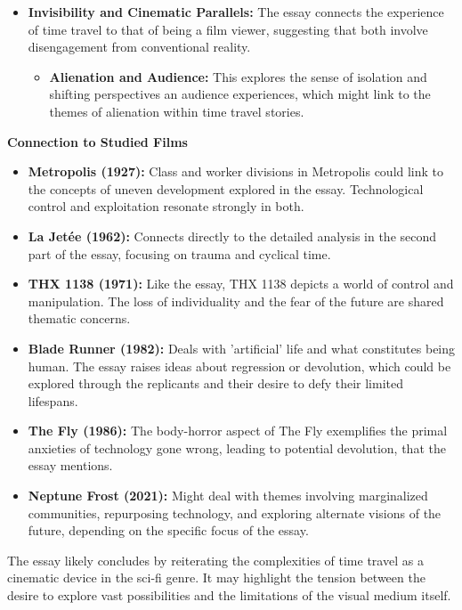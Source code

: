 \documentclass[11pt,fleqn]{book}
\begin{document}
\begin{itemize}
\item \textbf{Invisibility and Cinematic Parallels:} The essay connects the experience of time travel to that of being a film viewer, suggesting that both involve disengagement from conventional reality.
    \begin{itemize}
        \item \textbf{Alienation and Audience:} This explores the sense of isolation and shifting perspectives an audience experiences, which might link to the themes of alienation within time travel stories.
    \end{itemize}

\end{itemize}

\vspace{5pt}
\textbf{Connection to Studied Films}

\begin{itemize}
\item \textbf{Metropolis (1927):}  Class and worker divisions in Metropolis could link to the concepts of uneven development explored in the essay. Technological control and exploitation resonate strongly in both.

\item \textbf{La Jetée (1962):} Connects directly to the detailed analysis in the second part of the essay, focusing on trauma and cyclical time.

\item \textbf{THX 1138 (1971):}  Like the essay, THX 1138 depicts a world of control and manipulation. The loss of individuality and the fear of the future are shared thematic concerns. 

\item \textbf{Blade Runner (1982):} Deals with 'artificial' life and what constitutes being human. The essay raises ideas about regression or devolution, which could be explored through the replicants and their desire to defy their limited lifespans.

\item \textbf{The Fly (1986):}  The body-horror aspect of The Fly exemplifies the primal anxieties of technology gone wrong, leading to potential devolution, that the essay mentions.

\item \textbf{Neptune Frost (2021):} Might deal with themes involving marginalized communities, repurposing technology, and exploring alternate visions of the future, depending on the specific focus of the essay.

\end{itemize}
\vspace{5pt}
The essay likely concludes by reiterating the complexities of time travel as a cinematic device in the sci-fi genre. It may highlight the tension between the desire to explore vast possibilities and the limitations of the visual medium itself.
\end{document}
